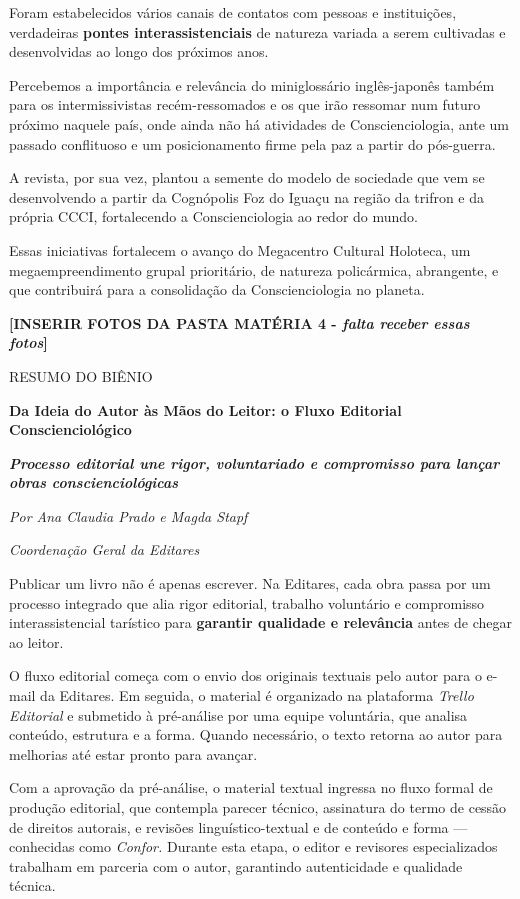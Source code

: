 Foram estabelecidos vários canais de contatos com pessoas e instituições, verdadeiras \textbf{pontes interassistenciais} de natureza variada a serem cultivadas e desenvolvidas ao longo dos próximos anos.

Percebemos a importância e relevância do miniglossário inglês-japonês também para os intermissivistas recém-ressomados e os que irão ressomar num futuro próximo naquele país, onde ainda não há atividades de Conscienciologia, ante um passado conflituoso e um posicionamento firme pela paz a partir do pós-guerra.

A revista, por sua vez, plantou a semente do modelo de sociedade que vem se desenvolvendo a partir da Cognópolis Foz do Iguaçu na região da trifron e da própria CCCI, fortalecendo a Conscienciologia ao redor do mundo.

Essas iniciativas fortalecem o avanço do Megacentro Cultural Holoteca, um megaempreendimento grupal prioritário, de natureza policármica, abrangente, e que contribuirá para a consolidação da Conscienciologia no planeta.

\textbf{{[}INSERIR FOTOS DA PASTA MATÉRIA 4 - \emph{falta receber essas fotos}{]}}

RESUMO DO BIÊNIO

\textbf{Da Ideia do Autor às Mãos do Leitor: o Fluxo Editorial Conscienciológico}

\emph{\textbf{Processo editorial une rigor, voluntariado e compromisso para lançar obras conscienciológicas}}

\emph{Por Ana Claudia Prado e Magda Stapf}

\emph{Coordenação Geral da Editares}

Publicar um livro não é apenas escrever. Na Editares, cada obra passa por um processo integrado que alia rigor editorial, trabalho voluntário e compromisso interassistencial tarístico para \textbf{garantir qualidade e relevância} antes de chegar ao leitor.

O fluxo editorial começa com o envio dos originais textuais pelo autor para o e-mail da Editares. Em seguida, o material é organizado na plataforma \emph{Trello Editorial} e submetido à pré-análise por uma equipe voluntária, que analisa conteúdo, estrutura e a forma. Quando necessário, o texto retorna ao autor para melhorias até estar pronto para avançar.

Com a aprovação da pré-análise, o material textual ingressa no fluxo formal de produção editorial, que contempla parecer técnico, assinatura do termo de cessão de direitos autorais, e revisões linguístico-textual e de conteúdo e forma --- conhecidas como \emph{Confor.} Durante esta etapa, o editor e revisores especializados trabalham em parceria com o autor, garantindo autenticidade e qualidade técnica.

